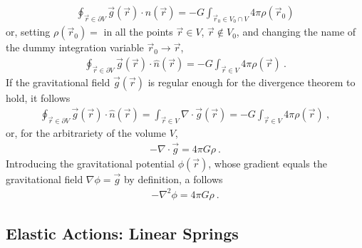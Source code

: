 \documentclass[letterpaper,10pt,english]{jupyterBook}
\begin{document}
\begin{equation*}
\begin{split}
  \oint_{\vec{r} \in \partial V} \vec{g}(\vec{r}) \cdot \hat{n}(\vec{r}) = - G \int_{\vec{r}_0 \in V_0 \cap V} 4 \pi \rho(\vec{r}_0) 
\end{split}
\end{equation*}
\sphinxAtStartPar
or, setting \(\rho(\vec{r}_0) = \) in all the points \(\vec{r} \in V\), \(\vec{r} \notin V_0\), and changing the name of the dummy integration variable \(\vec{r}_0 \rightarrow \vec{r}\),
\begin{equation*}
\begin{split}
  \oint_{\vec{r} \in \partial V} \vec{g}(\vec{r}) \cdot \hat{n}(\vec{r}) = - G \int_{\vec{r} \in V} 4 \pi \rho(\vec{r}) \ .
\end{split}
\end{equation*}
\sphinxAtStartPar
If the gravitational field \(\vec{g}(\vec{r})\) is regular enough for the divergence theorem to hold, it follows
\begin{equation}\label{equation:ch/actions-examples:eq:g:flux:V}
\begin{split}
  \oint_{\vec{r} \in \partial V} \vec{g}(\vec{r}) \cdot \hat{n}(\vec{r}) = \int_{\vec{r} \in V} \nabla \cdot \vec{g}(\vec{r})  = - G \int_{\vec{r} \in V} 4 \pi \rho(\vec{r}) \ ,
\end{split}
\end{equation}
\sphinxAtStartPar
or, for the arbitrariety of the volume \(V\),
\begin{equation*}
\begin{split}- \nabla \cdot \vec{g} = 4 \pi G \rho \ .\end{split}
\end{equation*}
\sphinxAtStartPar
Introducing the gravitational potential \(\phi(\vec{r})\), whose gradient equals the gravitational field \(\nabla \phi = \vec{g}\) by definition, a  follows
\begin{equation}\label{equation:ch/actions-examples:eq:g:poisson}
\begin{split}- \nabla^2 \phi = 4 \pi G \rho \ .\end{split}
\end{equation}

\subsection{Elastic Actions: Linear Springs}
\label{\detokenize{ch/actions-examples:elastic-actions-linear-springs}}\label{\detokenize{ch/actions-examples:classical-mechanics-actions-spring}}
\sphinxAtStartPar
{}
\end{document}
